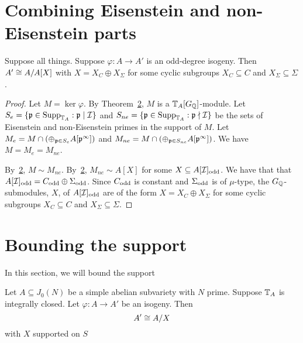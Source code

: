 \documentclass[thesis.tex]{subfiles}
\begin{document}
\section{Combining Eisenstein and non-Eisenstein parts}%
\label{sec:combining_eisenstein_and_non_eisenstein_parts}

\begin{corollary}
    Suppose all things. Suppose $\varphi:A\to A'$ is an odd-degree isogeny.
    Then $A'\cong A/A[X]$ with $X=X_C\oplus X_\Sigma$ for some cyclic subgroups
    $X_C\subseteq C$ and $X_\Sigma\subseteq \Sigma$.
\end{corollary}
\begin{proof}
    Let $M=\ker\varphi$. By Theorem~\ref{}, $M$ is a $\mathbb{T}_A[G_{\mathbb{Q}}]$-module. Let
    $S_e = \{\mathfrak{p} \in \operatorname{Supp}_{\mathbb{T}_A}: \mathfrak{p} \mid \mathcal{I}\}$ and $S_{ne} = \{\mathfrak{p} \in
    \operatorname{Supp}_{\mathbb{T}_A}: \mathfrak{p} \nmid \mathcal{I}\}$ be the sets of Eisenstein and non-Eisenstein
    primes in the support of $M$. Let $M_e = M \cap (\oplus_{\mathfrak{p} \in S_e}
    A[\mathfrak{p}^\infty])$ and $M_{ne} = M\cap (\oplus_{\mathfrak{p} \in S_{ne}} A[\mathfrak{p}^\infty])$.
    We have $M = M_e = M_{ne}$.

    By~\ref{}, $M\sim M_{ne}$. By~\ref{}, $M_{ne}\sim A[X]$ for some
    $X\subseteq A[\mathcal{I}]_{\mathrm{odd}}$. We have that that $A[\mathcal{I}]_{\mathrm{odd}} = C_{\mathrm{odd}}\oplus
    \Sigma_{\mathrm{odd}}$. Since $C_{\mathrm{odd}}$ is constant and $\Sigma_{\mathrm{odd}}$ is of
    $\mu$-type, the $G_{\mathbb{Q}}$-submodules, $X$, of $A[\mathcal{I}]_{\mathrm{odd}}$ are of the form 
    $X=X_C\oplus X_\Sigma$ for some cyclic subgroups
    $X_C\subseteq C$ and $X_\Sigma\subseteq \Sigma$.
\end{proof}

\section{Bounding the support}

In this section, we will bound the support


\begin{proposition}
    Let $A\subseteq J_0(N)$ be a simple abelian subvariety with $N$ prime.
    Suppose $\mathbb{T}_A$ is integrally closed. Let $\varphi:A\to A'$ be an isogeny.
    Then
    \[
        A' \cong A/X
    \]
    with $X$ supported on $S$
\end{proposition}
\end{document}
